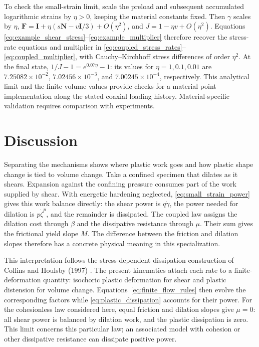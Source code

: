 \documentclass[11pt]{article}
\newcommand{\mbf}[1]{\mathbf{#1}}
\begin{document}
To check the small-strain limit, scale the preload and subsequent accumulated
logarithmic strains by \(\eta>0\), keeping the material constants fixed.
Then \(\gamma\) scales by \(\eta\),
\(\mbf F=\mbf I+\eta(s\mbf N-v\mbf I/3)+O(\eta^2)\), and
\(J=1-\eta v+O(\eta^2)\). Equations
\eqref{eq:example_shear_stress}--\eqref{eq:example_multiplier} therefore
recover the stress-rate equations and multiplier in
\eqref{eq:coupled_stress_rates}--\eqref{eq:coupled_multiplier}, with
Cauchy--Kirchhoff stress differences of order \(\eta^2\). At the final
state, \(1/J-1=e^{0.07\eta}-1\): its values for
\(\eta=1,0.1,0.01\) are \(7.25082\times10^{-2}\),
\(7.02456\times10^{-3}\), and \(7.00245\times10^{-4}\), respectively.
This analytical limit and the finite-volume values provide checks for a
material-point implementation along the stated coaxial loading history.
Material-specific validation requires comparison with experiments.

\section{Discussion}
\label{sec:discussion}

Separating the mechanisms shows where plastic work goes and how plastic shape
change is tied to volume change. Take a confined specimen that dilates as it
shears. Expansion against the confining pressure consumes part of the work
supplied by shear. With energetic hardening neglected,
\eqref{eq:small_strain_power} gives this work balance directly: the shear
power is \(q\dot\gamma\), the power needed for dilation is
\(p\dot\zeta^p\), and the remainder is dissipated. The coupled law assigns the
dilation cost through \(\beta\) and the dissipative resistance through
\(\mu\). Their sum gives the frictional yield slope \(M\). The difference
between the friction and dilation slopes therefore has a concrete physical
meaning in this specialization.

This interpretation follows the stress-dependent dissipation construction of
Collins and Houlsby (1997) \cite[Sec.~5]{collins1997}. The present kinematics
attach each rate to a finite-deformation quantity: isochoric plastic
deformation for shear and plastic distension for volume change.
Equations~\eqref{eq:finite_flow_rules} then evolve the corresponding factors
while \eqref{eq:plastic_dissipation} accounts for their power. For the
cohesionless law considered here, equal friction and dilation slopes give
\(\mu=0\): all shear power is balanced by dilation work, and the plastic
dissipation is zero. This limit concerns this particular law; an associated
model with cohesion or other dissipative resistance can dissipate positive
power.
\end{document}
